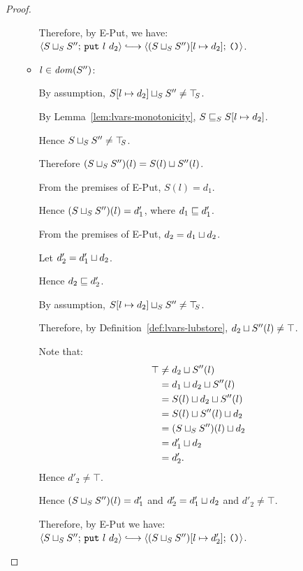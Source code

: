 \begin{proof}
\begin{itemize}
\begin{itemize}
          Therefore, by {\sc E-Put}, we have:
          $\config{\lubstore{S}{S''}}{\putexp{l}{d_2}} \parstepsto
          \config{\extSRaw{(\lubstore{S}{S''})}{l}{d_2}}{\unit}$.

        \item $l \in \mathit{dom}(S'')$:

          By assumption, $S[l \mapsto d_2] \sqcup_{S} S'' \neq
          \top\hspace{-0.85mm}_{S}$.

          By Lemma~\ref{lem:lvars-monotonicity},
          $S \sqsubseteq_S S[l \mapsto d_2]$.

          Hence $S \sqcup_{S} S'' \neq \top\hspace{-0.85mm}_{S}$.

          Therefore $(S \sqcup_{S} S'')(l) = S(l) \sqcup S''(l)$.

          From the premises of {\sc E-Put}, $S(l) = d_1$.
          
          Hence $(S \sqcup_{S} S'')(l) = d'_1$, where $d_1 \sqsubseteq
          d'_1$.

          From the premises of {\sc E-Put}, $d_2 =
          d_1 \sqcup d_2$.

          Let $d'_2 = d'_1 \sqcup d_2$.

          Hence $d_2 \sqsubseteq d'_2$.

          By assumption, $S[l \mapsto d_2] \sqcup_{S} S'' \neq
          \top\hspace{-0.85mm}_{S}$.

          Therefore, by Definition~\ref{def:lvars-lubstore},
          $d_2 \sqcup S''(l) \neq \top$.

          Note that:
          \begin{align*}
            \top &\neq d_2 \sqcup S''(l) \\ &=
            d_1 \sqcup d_2 \sqcup S''(l) \\ &=
            S(l) \sqcup d_2 \sqcup S''(l) \\ &=
            S(l) \sqcup S''(l) \sqcup d_2 \\ &=
            (S \sqcup_{S} S'')(l) \sqcup d_2 \\ &=
            d'_1 \sqcup d_2 \\ &= d'_2.
          \end{align*}
          Hence $d'_2 \neq \top$.

          Hence $(S \sqcup_{S} S'')(l) = d'_1$ and $d'_2 =
          d'_1 \sqcup d_2$ and $d'_2 \neq \top$.

          Therefore, by {\sc E-Put} we have:
          $\config{\lubstore{S}{S''}}{\putexp{l}{d_2}} \parstepsto
          \config{\extSRaw{(\lubstore{S}{S''})}{l}{d'_2}}{\unit}$.


\end{itemize}
\end{itemize}
\end{proof}
